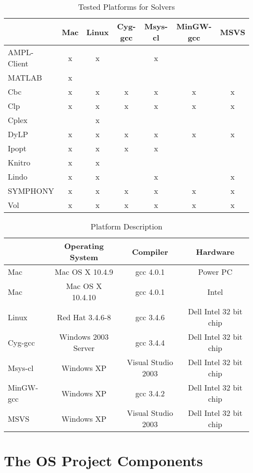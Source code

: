\documentclass[11pt]{article}
\renewcommand{\_}{{\char"5F}}
\renewcommand{\{}{{\char"7B}}
\renewcommand{\}}{{\char"7D}}
\renewcommand{\^}{{\char"0D}}
\renewcommand{\'}{{\char"0D}}
\begin{document}
\begin{table}
\caption{Tested Platforms for Solvers}
\centering
\label{table:testedplatforms}
\vskip 8pt
 \begin{tabular}{l|c|c|c|c|c|c|}
 &Mac&Linux&Cyg-gcc&Msys-cl&MinGW-gcc&MSVS \\ \hline
AMPL-Client &x&x&&x&& \\ \hline
MATLAB &x&&&&& \\ \hline
Cbc &x&x&x&x&x&x \\ \hline
Clp &x&x&x&x&x&x \\ \hline
Cplex &&x&&&& \\ \hline
DyLP &x&x&x&x&x&x \\ \hline
Ipopt &x&x&x&x&& \\ \hline
Knitro &x&x&&&& \\ \hline
Lindo &x&x&&x&&x \\ \hline
SYMPHONY &x&x&x&x&x&x \\ \hline
Vol &x&x&x&x&x&x \\ \hline
\end{tabular}
\end{table}


 \begin{table}
\caption{Platform Description}
\centering
\label{table:platformdescription}
\vskip 8pt
 \begin{tabular}{l|c|c|c|}
 & {\bf Operating System} & {\bf Compiler} & {\bf  Hardware} \\ \hline
 Mac &Mac OS X 10.4.9&gcc 4.0.1&Power PC \\   \hline
  Mac &Mac OS X 10.4.10&gcc 4.0.1&Intel \\   \hline
 Linux &Red Hat 3.4.6-8&gcc 3.4.6& Dell Intel 32 bit chip\\ \hline
 Cyg-gcc &Windows 2003 Server&gcc 3.4.4& Dell Intel 32 bit chip \\ \hline
 Msys-cl &Windows XP&Visual Studio 2003 &Dell Intel 32 bit chip \\ \hline
 MinGW-gcc &Windows XP&gcc 3.4.2&Dell Intel 32 bit chip \\ \hline
 MSVS &Windows XP&Visual Studio 2003 &Dell Intel 32 bit chip \\ \hline
\end{tabular}
\end{table}


\section{The OS Project Components}\label{section:projectcomponents}
\end{document}
